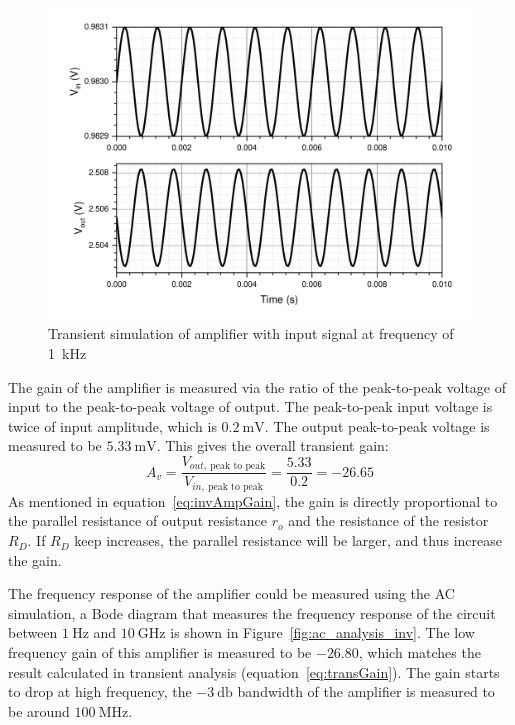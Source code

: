 \documentclass[12pt]{article}   %
\begin{document}
	\begin{figure}[htbp]
		\centering
		\includegraphics[width=0.7\linewidth]{Figures/E2_Inverting_Amplifier/Vin_Vout_1k}
		\caption{Transient simulation of amplifier with input signal at frequency of \SI{1}{\kilo\hertz}}
		\label{fig:tran1k}
	\end{figure}
	
	The gain of the amplifier is measured via the ratio of the peak-to-peak voltage of input to the peak-to-peak voltage of output. The peak-to-peak input voltage is twice of input amplitude, which is $\SI{0.2}{\milli\volt}$. The output peak-to-peak voltage is measured to be $\SI{5.33}{\milli\volt}$. This gives the overall transient gain:
	\begin{equation}
		A_v = \frac{V_{out,\ \text{peak to peak}}}{V_{in,\ \text{peak to peak}}} = \frac{5.33}{0.2} = -26.65
		\label{eq:transGain}
	\end{equation}
	As mentioned in equation~\eqref{eq:invAmpGain}, the gain is directly proportional to the parallel resistance of output resistance $r_o$ and the resistance of the resistor $R_D$. If $R_D$ keep increases, the parallel resistance will be larger, and thus increase the gain.
	
	The frequency response of the amplifier could be measured using the AC simulation, a Bode diagram that measures the frequency response of the circuit between $\SI{1}{\hertz}$ and $\SI{10}{\giga\hertz}$ is shown in Figure~\ref{fig:ac_analysis_inv}. The low frequency gain of this amplifier is measured to be $-26.80$, which matches the result calculated in transient analysis (equation~\eqref{eq:transGain}). The gain starts to drop at high frequency, the $\SI{-3}{\decibel}$ bandwidth of the amplifier is measured to be around $\SI{100}{\mega\hertz}$.
	
\end{document}
